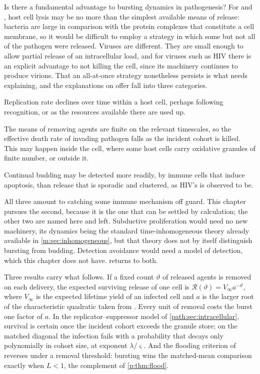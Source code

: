 Is there a fundamental advantage to bursting dynamics in pathogenesis? For
\ft{} and \yp{}, host cell lysis may be no more than the simplest available
means of release: bacteria are large in comparison with the protein complexes
that constitute a cell membrane, so it would be difficult to employ a
strategy in which some but not all of the pathogen were released. Viruses are
different. They are small enough to allow partial release of an
intracellular load, and for viruses such as HIV there is an explicit
advantage to not killing the cell, since its machinery continues to produce
virions. That an all-at-once strategy nonetheless persists is what needs
explaining, and the explanations on offer fall into three categories.

\begin{description}[leftmargin=1.4em,style=unboxed,itemsep=0.2em]
\item[Subductive proliferation.] Replication rate declines over time within
a host cell, perhaps following recognition, or as the resources available
there are used up.
\item[Limited killing.] The means of removing agents are finite on the
relevant timescales, so the effective death rate of invading pathogen falls
as the incident cohort is killed. This may happen inside the cell, where
some host cells carry oxidative granules of finite number, or outside it.
\item[Detection avoidance.] Continual budding may be detected more readily,
by immune cells that induce apoptosis, than release that is sporadic and
clustered, as HIV's is observed to be.
\end{description}

All three amount to catching some immune mechanism off guard. This chapter
pursues the second, because it is the one that can be settled by
calculation; the other two are named here and left. Subductive proliferation
would need no new machinery, its dynamics being the standard
time-inhomogeneous theory already available in \cref{m:sec:inhomogeneous},
but that theory does not by itself distinguish bursting from budding.
Detection avoidance would need a model of detection, which this chapter does
not have.  returns to both.

Three results carry what follows. If a fixed count $\vartheta$ of released
agents is removed on each delivery, the expected surviving release of one
cell is $\mathcal{R}(\vartheta)=V_\infty a^{-\vartheta}$, where $V_\infty$
is the expected lifetime yield of an infected cell and $a$ is the larger
root of the characteristic quadratic taken from \ChCore{}. Every unit of
removal costs the burst one factor of $a$. In the replicator--suppressor
model of \cref{path:sec:intracellular}, survival is certain once the
incident cohort exceeds the granule store; on the matched diagonal the
infection fails with a probability that decays only polynomially in cohort
size, at exponent $\lambda/\varsigma$. And the flooding criterion of
\ChPop{} reverses under a removal threshold: bursting wins the matched-mean
comparison exactly when $L<1$, the complement of \cref{p:thm:flood}.

